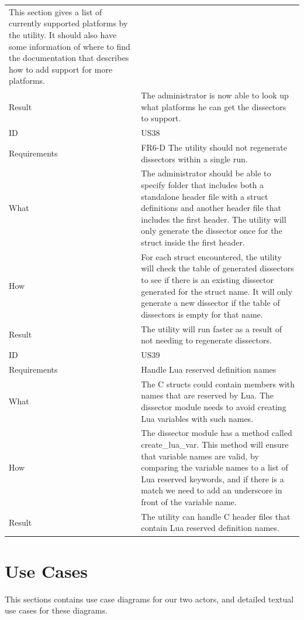 \begin{table}[htbp]
{\begin{tabularx}{1.2\textwidth}{l X}
	This section gives a list of currently supported platforms by the utility. It should also have some information of where to	find the documentation that describes
	how to add support for more platforms. \\
	Result & The administrator is now able to look up what platforms he can get the dissectors to support. \\
	\midrule
	ID & US38 \\
	Requirements & FR6-D The utility should not regenerate dissectors within a single run. \\
	What & The administrator should be able to specify folder that includes both a standalone header file with a struct definitions and another header file that includes
	the first header. The utility will only generate the dissector once for the struct inside the first header. \\
	How & For each struct encountered, the utility will check the table of generated dissectors to see if there is an existing dissector generated for the struct name.
	It will only generate a new dissector if the table of dissectors is empty for that name. \\
	Result & The utility will run faster as a result of not needing to regenerate dissectors. \\
	\midrule
	ID & US39 \\
	Requirements & Handle Lua reserved definition names \\
	What & The C structs could contain members with names that are reserved by Lua. The dissector module needs to avoid creating Lua variables with such names.  \\
	How &	 The dissector module has a method called create\_lua\_var. This method will ensure that variable names are valid, by comparing the variable names to a list
	of Lua reserved keywords, and if there is a match we need to add an underscore in front of the variable name. \\ 
	Result & The utility can handle C header files that contain Lua reserved definition names. \\
	\bottomrule
\end{tabularx}}
\end{table}

\section{Use Cases}
\label{sec:req:usecases}
This sections contains use case diagrams for our two actors, and detailed
textual use cases for these diagrams.

